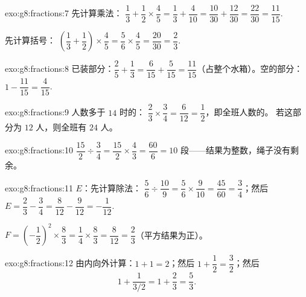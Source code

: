 \begin{solution}{exo:g8:fractions:7}
先计算乘法：
$\dfrac13 + \dfrac12 \times \dfrac45 = \dfrac13 + \dfrac{4}{10}
= \dfrac{10}{30} + \dfrac{12}{30} = \dfrac{22}{30} = \dfrac{11}{15}$.

先计算括号：
$\left(\dfrac13 + \dfrac12\right) \times \dfrac45
= \dfrac56 \times \dfrac45 = \dfrac{20}{30} = \dfrac23$.
\end{solution}

\begin{solution}{exo:g8:fractions:8}
已装部分：$\dfrac25 + \dfrac13 = \dfrac{6}{15} + \dfrac{5}{15} =
\dfrac{11}{15}$（占整个水箱）。空的部分：
$1 - \dfrac{11}{15} = \dfrac{4}{15}$.
\end{solution}

\begin{solution}{exo:g8:fractions:9}
人数多于 $14$ 时的：
$\dfrac23 \times \dfrac34 = \dfrac{6}{12} = \dfrac12$，即全班人数的。
若这部分为 $12$ 人，则全班有 $24$ 人。
\end{solution}

\begin{solution}{exo:g8:fractions:10}
$\dfrac{15}{2} \div \dfrac34 = \dfrac{15}{2} \times \dfrac43
= \dfrac{60}{6} = 10$ 段——结果为整数，绳子没有剩余。
\end{solution}

\begin{solution}{exo:g8:fractions:11}
$E$：先计算除法：
$\dfrac56 \div \dfrac{10}{9} = \dfrac56 \times \dfrac{9}{10}
= \dfrac{45}{60} = \dfrac34$；然后
$E = \dfrac23 - \dfrac34 = \dfrac{8}{12} - \dfrac{9}{12} =
-\dfrac{1}{12}$.

$F = \left(-\dfrac12\right)^2 \times \dfrac83 = \dfrac14 \times
\dfrac83 = \dfrac{8}{12} = \dfrac23$（平方结果为正）。
\end{solution}

\begin{solution}{exo:g8:fractions:12}
由内向外计算：$1 + 1 = 2$；然后
$1 + \dfrac12 = \dfrac32$；然后
\[
1 + \frac{1}{3/2} = 1 + \frac23 = \frac53 .
\]
\end{solution}

